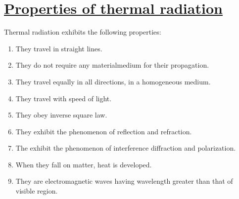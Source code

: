 \documentclass[12pt,a4paper]{article}
\begin{document}
\section{\underline{Properties of thermal radiation}}
Thermal radiation exhibits the following properties:
\begin{enumerate}
	\item They travel in straight lines.
	\item They do not require any materialmedium for their propagation.
	\item They travel equally in all directions, in a homogeneous medium.
	\item They travel with speed of light.
	\item They obey inverse square law.
	\item They exhibit the phenomenon of reflection and refraction.
	\item The exhibit the phenomenon of interference diffraction and polarization.
	\item When they fall on matter, heat is developed.
	\item They are electromagnetic waves having wavelength greater than that of visible region.
\end{enumerate}
\end{document}
